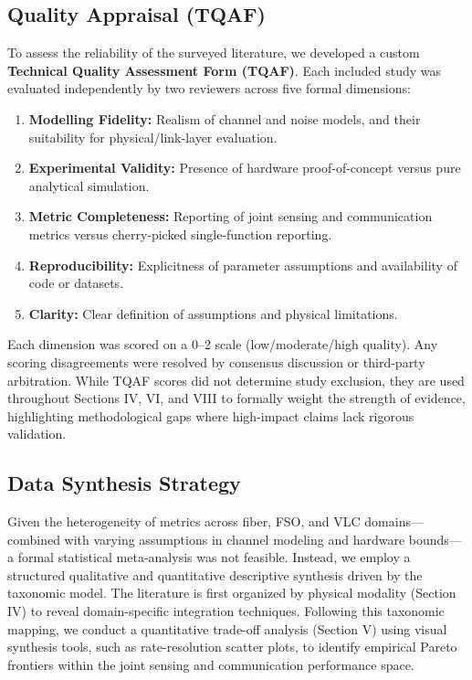 \subsection{Quality Appraisal (TQAF)}
To assess the reliability of the surveyed literature, we developed a custom \textbf{Technical Quality Assessment Form (TQAF)}. Each included study was evaluated independently by two reviewers across five formal dimensions:
\begin{enumerate}
    \item \textbf{Modelling Fidelity:} Realism of channel and noise models, and their suitability for physical/link-layer evaluation.
    \item \textbf{Experimental Validity:} Presence of hardware proof-of-concept versus pure analytical simulation.
    \item \textbf{Metric Completeness:} Reporting of joint sensing and communication metrics versus cherry-picked single-function reporting.
    \item \textbf{Reproducibility:} Explicitness of parameter assumptions and availability of code or datasets.
    \item \textbf{Clarity:} Clear definition of assumptions and physical limitations.
\end{enumerate}

Each dimension was scored on a 0--2 scale (low/moderate/high quality). Any scoring disagreements were resolved by consensus discussion or third-party arbitration. While TQAF scores did not determine study exclusion, they are used throughout Sections IV, VI, and VIII to formally weight the strength of evidence, highlighting methodological gaps where high-impact claims lack rigorous validation.

\subsection{Data Synthesis Strategy}
Given the heterogeneity of metrics across fiber, FSO, and VLC domains---combined with varying assumptions in channel modeling and hardware bounds---a formal statistical meta-analysis was not feasible. Instead, we employ a structured qualitative and quantitative descriptive synthesis driven by the taxonomic model. The literature is first organized by physical modality (Section IV) to reveal domain-specific integration techniques. Following this taxonomic mapping, we conduct a quantitative trade-off analysis (Section V) using visual synthesis tools, such as rate-resolution scatter plots, to identify empirical Pareto frontiers within the joint sensing and communication performance space.
